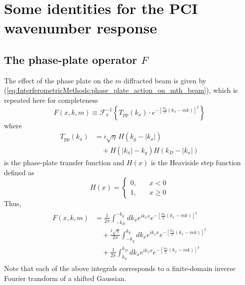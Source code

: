 \chapter{Some identities for the PCI wavenumber response}


\section{The phase-plate operator $F$}
The effect of the phase plate on the $m$ diffracted beam is given by
(\ref{eq:InterferometricMethods:phase_plate_action_on_mth_beam}),
which is repeated here for completeness
\begin{equation}
  F(x, k, m)
  \equiv
  \mathcal{F}_x^{-1}
  \left\{
    T_{\text{pp}}(k_x)
    \cdot
    e^{-\left[ \frac{w_0}{2} \left( k_x - m k \right) \right]^2}
  \right\}
  \label{eq:PCIResponseIdentities:phase_plate_action_on_mth_beam}
\end{equation}
where
\begin{equation}
  \begin{aligned}
    T_{\text{pp}}(k_x)
    &=
    i \sqrt{\eta} \, H(k_g - |k_x|)
    \\
    &\quad +
    H(|k_x| - k_g)
    H(k_D - |k_x|)
  \end{aligned}
  \label{eq:PCIResponseIdentities:phase_plate_transfer_function}
\end{equation}
is the phase-plate transfer function and
$H(x)$ is the Heaviside step function defined as
\begin{equation}
  H(x)
  =
  \begin{cases}
    0, \quad &x < 0 \\
    1, \quad &x \geq 0
  \end{cases}
  \label{eq:PCIResponseIdentities:Heaviside_step_function}
\end{equation}
Thus,
\begin{align}
  \begin{aligned}
    F(x, k, m)
    &=
    \frac{1}{2 \pi}
    \int_{-k_D}^{-k_g}
    dk_x
    e^{i k_x x}
    e^{-\left[ \frac{w_0}{2} \left( k_x - m k \right) \right]^2}
    \\
    &\quad +
    \frac{i \sqrt{\eta}}{2 \pi}
    \int_{-k_g}^{k_g}
    dk_x
    e^{i k_x x}
    e^{-\left[ \frac{w_0}{2} \left( k_x - m k \right) \right]^2}
    \\
    &\quad +
    \frac{1}{2 \pi}
    \int_{k_g}^{k_D}
    dk_x
    e^{i k_x x}
    e^{-\left[ \frac{w_0}{2} \left( k_x - m k \right) \right]^2}
  \end{aligned}
  \label{eq:PCIResponseIdentities:phase_plate_action_on_mth_beam_integrals}
\end{align}
Note that each of the above integrals
corresponds to a finite-domain inverse Fourier transform
of a shifted Gaussian.


